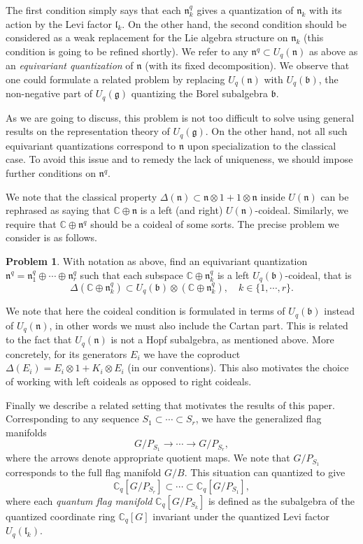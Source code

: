 \documentclass[a4paper, 12pt, reqno, english]{amsart}
\numberwithin{equation}{section}
\numberwithin{figure}{section}
\theoremstyle{plain}
\theoremstyle{plain}
\theoremstyle{plain}
\theoremstyle{plain}
\theoremstyle{plain}
\theoremstyle{definition}
\theoremstyle{definition}
\theoremstyle{definition}
\theoremstyle{remark}
\theoremstyle{definition}
\newtheorem{problem}[theorem]{Problem}
\theoremstyle{definition}
\newcommand{\Uqb}{U_q(\mathfrak{b})}
\newcommand{\Uqg}{U_q(\mathfrak{g})}
\newcommand{\Uqn}{U_q(\mathfrak{n})}
\newcommand{\Uqlk}{U_q(\mathfrak{l}_k)}
\newcommand{\bbC}{\mathbb{C}}
\newcommand{\lieb}{\mathfrak{b}}
\newcommand{\liel}{\mathfrak{l}}
\newcommand{\lien}{\mathfrak{n}}
\newcommand{\qnil}{\lien^q}
\newcommand{\Cq}{\mathbb{C}_q}
\begin{document}
The first condition simply says that each $\qnil_k$ gives a quantization of $\lien_k$ with its action by the Levi factor $\liel_k$.
On the other hand, the second condition should be considered as a weak replacement for the Lie algebra structure on $\lien_k$ (this condition is going to be refined shortly).
We refer to any $\qnil \subset \Uqn$ as above as an \emph{equivariant quantization} of $\lien$ (with its fixed decomposition).
We observe that one could formulate a related problem by replacing $\Uqn$ with $\Uqb$, the non-negative part of $\Uqg$ quantizing the Borel subalgebra $\lieb$.

As we are going to discuss, this problem is not too difficult to solve using general results on the representation theory of $\Uqg$.
On the other hand, not all such equivariant quantizations correspond to $\lien$ upon specialization to the classical case.
To avoid this issue and to remedy the lack of uniqueness, we should impose further conditions on $\qnil$.

We note that the classical property $\Delta(\lien) \subset \lien \otimes 1 + 1 \otimes \lien$ inside $U(\lien)$ can be rephrased as saying that $\bbC \oplus \lien$ is a left (and right) $U(\lien)$-coideal.
Similarly, we require that $\bbC \oplus \qnil$ should be a coideal of some sorts. The precise problem we consider is as follows.

\begin{problem}
\label{prob:coideal}
With notation as above, find an equivariant quantization $\qnil = \qnil_1 \oplus \cdots \oplus \qnil_r$ such that each subspace $\bbC \oplus \qnil_k$ is a left $\Uqb$-coideal, that is
\[
\Delta(\bbC \oplus \qnil_k) \subset \Uqb \otimes (\bbC \oplus \qnil_k), \quad
k \in \{ 1, \cdots, r \}.
\]
\end{problem}

We note that here the coideal condition is formulated in terms of $\Uqb$ instead of $\Uqn$, in other words we must also include the Cartan part.
This is related to the fact that $\Uqn$ is not a Hopf subalgebra, as mentioned above. More concretely, for its generators $E_i$ we have the coproduct $\Delta(E_i) = E_i \otimes 1 + K_i \otimes E_i$ (in our conventions).
This also motivates the choice of working with left coideals as opposed to right coideals.

Finally we describe a related setting that motivates the results of this paper.
Corresponding to any sequence $S_1 \subset \cdots \subset S_r$, we have the generalized flag manifolds
\[
G / P_{S_1} \to \cdots \to G / P_{S_r},
\]
where the arrows denote appropriate quotient maps. We note that $G / P_{S_1}$ corresponds to the full flag manifold $G / B$. This situation can quantized to give
\[
\Cq[G / P_{S_r}] \subset \cdots \subset \Cq[G / P_{S_1}],
\]
where each \emph{quantum flag manifold} $\Cq[G / P_{S_k}]$ is defined as the subalgebra of the quantized coordinate ring $\Cq[G]$ invariant under the quantized Levi factor $\Uqlk$.
\end{document}
